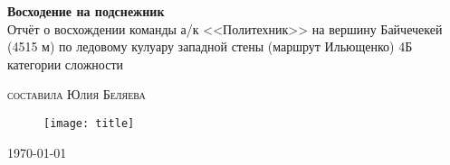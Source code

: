 \documentclass[fleqn, 10pt]{extarticle}
\begin{document}

\begin{titlepage}
	\clearpage\thispagestyle{empty}
	\begin{center} %
		
		\vfill

		{\LARGE\textbf{Восходение на подснежник}\\
			\large{Отчёт о восхождении команды а/к <<Политехник>> на вершину Байчечекей (4515 м)
			по ледовому кулуару западной стены (маршрут Ильющенко) 4Б категории сложности}} %

		\vspace{50pt} %

		{\textsc{составила Юлия Беляева}} %

		\vspace{40pt} %

		\begin{figure}[ht]
			\centering
			\texttt{[image: title]}
		\end{figure}
		
		\vfill

		\today
	\end{center}
\end{titlepage}


\newpage\tableofcontents\newpage
\end{document}

